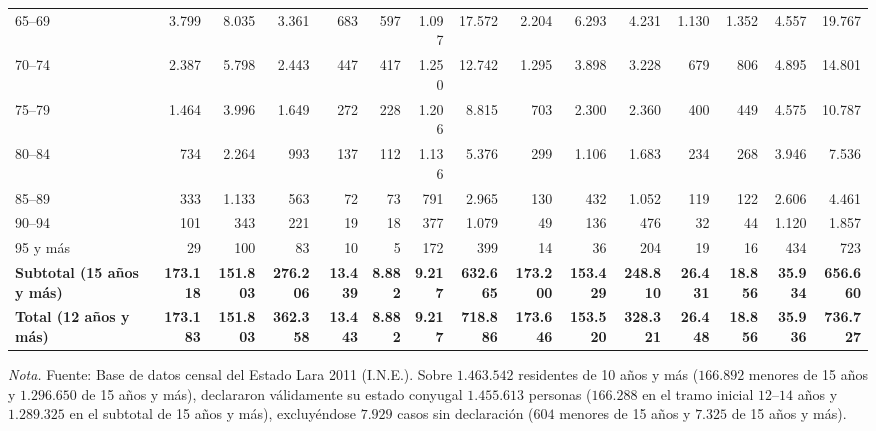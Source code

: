 \documentclass[12pt,letterpaper]{article}
\begin{document}
\begin{table}[htbp]
{\begin{tabular}{lrrrrrrrrrrrrrr}
        65--69 & 3.799 & 8.035 & 3.361 & 683 & 597 & 1.097 & 17.572 & 2.204 & 6.293 & 4.231 & 1.130 & 1.352 & 4.557 & 19.767 \\
        70--74 & 2.387 & 5.798 & 2.443 & 447 & 417 & 1.250 & 12.742 & 1.295 & 3.898 & 3.228 & 679 & 806 & 4.895 & 14.801 \\
        75--79 & 1.464 & 3.996 & 1.649 & 272 & 228 & 1.206 & 8.815 & 703 & 2.300 & 2.360 & 400 & 449 & 4.575 & 10.787 \\
        80--84 & 734 & 2.264 & 993 & 137 & 112 & 1.136 & 5.376 & 299 & 1.106 & 1.683 & 234 & 268 & 3.946 & 7.536 \\
        85--89 & 333 & 1.133 & 563 & 72 & 73 & 791 & 2.965 & 130 & 432 & 1.052 & 119 & 122 & 2.606 & 4.461 \\
        90--94 & 101 & 343 & 221 & 19 & 18 & 377 & 1.079 & 49 & 136 & 476 & 32 & 44 & 1.120 & 1.857 \\
        95 y más & 29 & 100 & 83 & 10 & 5 & 172 & 399 & 14 & 36 & 204 & 19 & 16 & 434 & 723 \\
        \midrule
        \textbf{Subtotal (15 años y más)} & \textbf{173.118} & \textbf{151.803} & \textbf{276.206} & \textbf{13.439} & \textbf{8.882} & \textbf{9.217} & \textbf{632.665} & \textbf{173.200} & \textbf{153.429} & \textbf{248.810} & \textbf{26.431} & \textbf{18.856} & \textbf{35.934} & \textbf{656.660} \\
        \textbf{Total (12 años y más)} & \textbf{173.183} & \textbf{151.803} & \textbf{362.358} & \textbf{13.443} & \textbf{8.882} & \textbf{9.217} & \textbf{718.886} & \textbf{173.646} & \textbf{153.520} & \textbf{328.321} & \textbf{26.448} & \textbf{18.856} & \textbf{35.936} & \textbf{736.727} \\
        \bottomrule
    \end{tabular}%
    }
    \par\vspace{2pt}\noindent\raggedright \scriptsize \textit{Nota.} Fuente: Base de datos censal del Estado Lara 2011 (I.N.E.). Sobre $1.463.542$ residentes de 10 años y más ($166.892$ menores de 15 años y $1.296.650$ de 15 años y más), declararon válidamente su estado conyugal $1.455.613$ personas ($166.288$ en el tramo inicial $12\text{--}14$ años y $1.289.325$ en el subtotal de 15 años y más), excluyéndose $7.929$ casos sin declaración ($604$ menores de 15 años y $7.325$ de 15 años y más).
\end{table}
\end{document}

